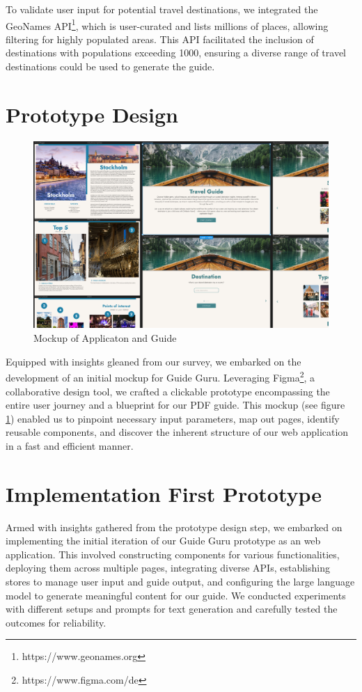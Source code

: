 \documentclass[english,notitlepage,smartquotes]{hgbreport}
\begin{document}
To validate user input for potential travel destinations, we integrated the GeoNames API\footnote{https://www.geonames.org}, which is user-curated and lists millions of places, allowing filtering for highly populated areas. This API facilitated the inclusion of destinations with populations exceeding 1000, ensuring a diverse range of travel destinations could be used to generate the guide.

\section{Prototype Design}

\begin{figure}
	\centering
	\includegraphics[width=1\textwidth]{Mockup_Example.png}
	\caption{Mockup of Applicaton and Guide}
	\label{fig1}
\end{figure}

Equipped with insights gleaned from our survey, we embarked on the development of an initial mockup for Guide Guru. Leveraging Figma\footnote{https://www.figma.com/de}, a collaborative design tool, we crafted a clickable prototype encompassing the entire user journey and a blueprint for our PDF guide. This mockup (see figure  \ref{fig1}) enabled us to pinpoint necessary input parameters, map out pages, identify reusable components, and discover the inherent structure of our web application in a fast and efficient manner.


\section{Implementation First Prototype}
 
Armed with insights gathered from the prototype design step, we embarked on implementing the initial iteration of our Guide Guru prototype as an web application. This involved constructing components for various functionalities, deploying them across multiple pages, integrating diverse APIs, establishing stores to manage user input and guide output, and configuring the large language model to generate meaningful content for our guide. We conducted experiments with different setups and prompts for text generation and carefully tested the outcomes for reliability.
\end{document}
